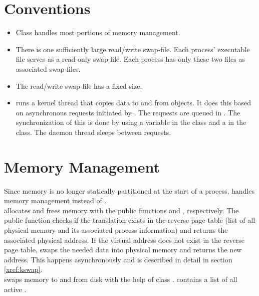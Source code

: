   \section{Conventions}
  \label{xref:convs}
    \begin{itemize}
      \item Class  handles most portions of memory management.
      \item There is one sufficiently large read/write swap-file.
            Each process' executable file serves as a read-only
	    swap-file.  Each process has only these two files as
	    associated swap-files.
      \item The read/write swap-file has a fixed size.
      \item {} runs a kernel thread that copies
	    data to and from  objects.  It
	    does this based on asynchronous requests initiated by 
	    .  
	    The requests are queued in .  The synchronization
	    of this is done by using a  variable in the
	     class and a  in the 
	    class.
	    The daemon thread sleeps between requests.
    \end{itemize}

  \section{Memory Management}
    Since memory is no longer statically partitioned at the 
    start of a process,  handles memory management
    instead of .\\

     allocates and frees memory with
    the public functions  and ,
    respectively.
    The public function  checks
    if the translation exists in the reverse page table (list of all physical 
    memory and its associated process information) and returns the associated 
    physical address. 
    If the virtual address does not exist in the reverse page table,
     swaps the needed data into physical memory and returns the
    new address.  This happens asynchronously and is described in detail in
    section \ref{xref:kswap}.\\

     swaps memory to and from disk with the 
    help of class .  contains a list
    of all active .\\

